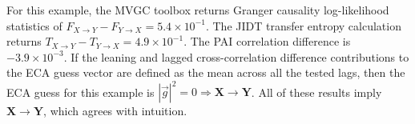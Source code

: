 
For this example, the MVGC toolbox returns Granger causality log-likelihood statistics of $F_{X\rightarrow Y}-F_{Y\rightarrow X}=5.4\times 10^{-1}$.  The JIDT transfer entropy calculation returns $T_{X\rightarrow Y}-T_{Y\rightarrow X}=4.9\times 10^{-1}$.  The PAI correlation difference is $-3.9\times 10^{-3}$.  If the leaning and lagged cross-correlation difference contributions to the ECA guess vector are defined as the mean across all the tested lags, then the ECA guess for this example is $|\vec{g}|^2=0\Rightarrow \mathbf{X}\rightarrow\mathbf{Y}$.  All of these results imply $\mathbf{X}\rightarrow\mathbf{Y}$, which agrees with intuition.   

